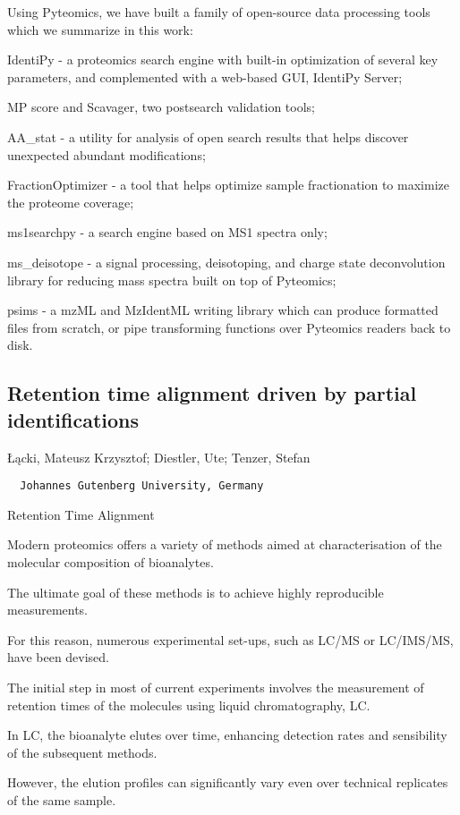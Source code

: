 {Using Pyteomics, we have built a family of open-source data processing tools which we summarize in this work:

IdentiPy - a proteomics search engine with built-in optimization of several key parameters, and complemented with a web-based GUI, IdentiPy Server;

MP score and Scavager, two postsearch validation tools;

AA\_stat - a utility for analysis of open search results that helps discover unexpected abundant modifications;

FractionOptimizer - a tool that helps optimize sample fractionation to maximize the proteome coverage;

ms1searchpy - a search engine based on MS1 spectra only;

ms\_deisotope - a signal processing, deisotoping, and charge state deconvolution library for reducing mass spectra built on top of Pyteomics;

psims - a mzML and MzIdentML writing library which can produce formatted files from scratch, or pipe transforming functions over Pyteomics readers back to disk.


\subsection*{\color{eubicRed} Retention time alignment driven by partial identifications}
{\color{eubicGray}Łącki, Mateusz Krzysztof;
Diestler, Ute;
Tenzer, Stefan}
{\color{eubicGray}\begin{verbatim}
  Johannes Gutenberg University, Germany
\end{verbatim}}

Retention Time Alignment

Modern proteomics offers a variety of methods aimed at characterisation of the molecular composition of bioanalytes.

The ultimate goal of these methods is to achieve highly reproducible measurements.

For this reason, numerous experimental set-ups, such as LC/MS or LC/IMS/MS, have been devised.

The initial step in most of current experiments involves the measurement of retention times of the molecules using liquid chromatography, LC.

In LC, the bioanalyte elutes over time, enhancing detection rates and sensibility of the subsequent methods.

However, the elution profiles can significantly vary even over technical replicates of the same sample.

}
